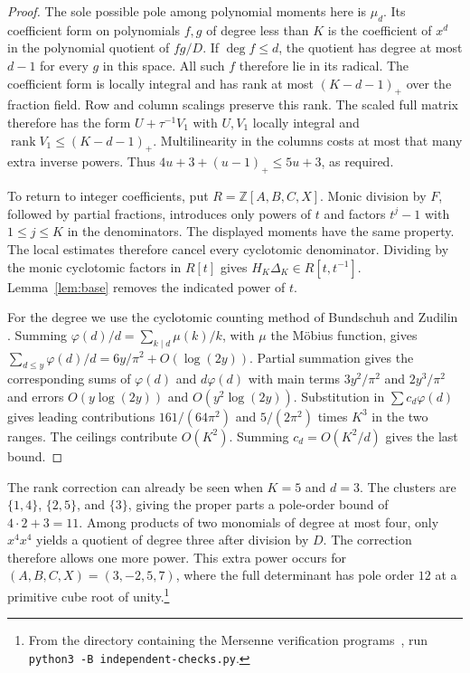 \documentclass[11pt]{article}
\newcommand{\Z}{\mathbb Z}
\newcommand{\ph}{\varphi}
\DeclareMathOperator{\rank}{rank}
\begin{document}
\begin{proof}
The sole possible pole among polynomial moments here is \(\mu_d\).
Its coefficient form on polynomials \(f,g\) of degree less than \(K\)
is the coefficient of \(x^d\) in the polynomial quotient of \(fg/D\).
If \(\deg f\le d\), the quotient has degree at most \(d-1\) for every
\(g\) in this space. All such \(f\) therefore lie in its radical.
The coefficient form is locally integral and has rank at most
\((K-d-1)_+\) over the fraction field. Row and column scalings preserve
this rank. The scaled full matrix therefore has the form \(U+\tau^{-1}V_1\)
with \(U,V_1\) locally integral and \(\rank V_1\le(K-d-1)_+\).
Multilinearity in the columns costs at most that many extra inverse
powers. Thus \(4u+3+(u-1)_+\le5u+3\), as required.

To return to integer coefficients, put \(R=\Z[A,B,C,X]\).
Monic division by \(F\), followed by partial fractions, introduces
only powers of \(t\) and factors \(t^j-1\) with \(1\le j\le K\)
in the denominators. The displayed moments have the same property.
The local estimates therefore cancel every cyclotomic denominator.
Dividing by the monic cyclotomic factors in \(R[t]\) gives
\(H_K\Delta_K\in R[t,t^{-1}]\). Lemma~\ref{lem:base} removes the
indicated power of \(t\).

For the degree we use the cyclotomic counting method of
Bundschuh and Zudilin \cite[\S3]{BZ}. Summing
\(\ph(d)/d=\sum_{k\mid d}\mu(k)/k\), with \(\mu\) the M\"obius function,
gives \(\sum_{d\le y}\ph(d)/d=6y/\pi^2+O(\log(2y))\).
Partial summation gives the corresponding sums of \(\ph(d)\) and
\(d\ph(d)\) with main terms \(3y^2/\pi^2\) and \(2y^3/\pi^2\)
and errors \(O(y\log(2y))\) and \(O(y^2\log(2y))\).
Substitution in \(\sum c_d\ph(d)\) gives leading contributions
\(161/(64\pi^2)\) and \(5/(2\pi^2)\) times \(K^3\) in the two ranges.
The ceilings contribute \(O(K^2)\). Summing \(c_d=O(K^2/d)\)
gives the last bound.
\end{proof}

\begin{samepage}
The rank correction can already be seen when \(K=5\) and \(d=3\).
The clusters are \(\{1,4\}\), \(\{2,5\}\), and \(\{3\}\), giving
the proper parts a pole-order bound of \(4\cdot2+3=11\).
Among products of two monomials of degree at most four, only
\(x^4x^4\) yields a quotient of degree three after division by \(D\).
The correction therefore allows one more power. This extra power
occurs for \((A,B,C,X)=(3,-2,5,7)\), where the full determinant has
pole order \(12\) at a primitive cube root of unity.\footnote{From the
directory containing the Mersenne verification programs~\cite{MersenneCode},
run \texttt{python3 -B independent-checks.py}.}\par
\end{samepage}
\end{document}
